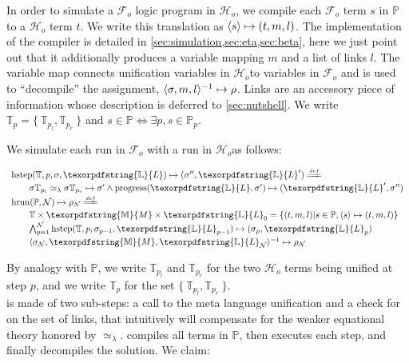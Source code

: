 \documentclass[sigconf,natbib=false,review]{acmart}
\newcommand{\UnifRel}{\ensuremath{\simeq}}
\newcommand{\Ue}{\ensuremath{\UnifRel_\lambda}\xspace}
\newcommand{\Fo}{\texorpdfstring{\ensuremath{\mathcal{F}_{\!o}\xspace}}{Fo}} %
\newcommand{\Ho}{\texorpdfstring{\ensuremath{\mathcal{H}_o}\xspace}{Ho}}
\newcommand{\linkStore}{\texorpdfstring{\ensuremath{\mathbb{L}}\xspace}{L}}
\newcommand{\mapStore}{\texorpdfstring{\ensuremath{\mathbb{M}}\xspace}{M}}
\newcommand{\foUnifPb}{\ensuremath{\mathbb{P}}\xspace}
\newcommand{\hoUnifPb}{\ensuremath{\mathbb{T}}\xspace}
\begin{document}
\noindent
In order to simulate a \Fo{} logic program in \Ho{}, we compile
each \Fo{} term $s$ in \foUnifPb to a \Ho{} term $t$.
We write this translation as $\langle s \rangle\mapsto(t,m,l)$. The implementation of the compiler
is detailed in \cref{sec:simulation,sec:eta,sec:beta}, here we just point
out that it additionally produces a variable mapping $m$ and a list of links $l$.
The variable map connects unification variables in \Ho to variables
in \Fo{} and is used to ``decompile'' the assignment,
$\langle \sigma,m,l \rangle^{-1}\mapsto \rho$. Links are an accessory piece of information whose
description is deferred to \cref{sec:nutshell}.
We write $\hoUnifPb_p = \{~ \hoUnifPb_{p_l}, \hoUnifPb_{p_r} ~\}$
and $s \in \foUnifPb \Leftrightarrow \exists p, s \in \foUnifPb_p$.

We simulate each run in \Fo{} with a run in \Ho as follows:

$$
\begin{array}{l}
\stepH{\hoUnifPb}{p}{\sigma}{\linkStore}{\sigma''}{\linkStore'} \deff\vspace{2pt}\\
  \qquad\stepHD{\hoUnifPb}{p}{\sigma}{\sigma'}{\sigma''}{\linkStore}\vspace{2pt}\\
  \runH{\foUnifPb}{\mathcal{N}}{\rho} \deff \vspace{2pt}\\
  \qquad \hoUnifPb \times \mapStore \times \linkStore_0 = \{ (t,m,l) | s \in \foUnifPb, \C{s}{t}{m}{l} \}\vspace{2pt}\\
  \qquad \runHD{\hoUnifPb}{\mathcal{N}}{\linkStore}\vspace{2pt}\\
  \qquad \D{\sigma_{\mathcal{N}}}{\mapStore}{\linkStore_{\mathcal{N}}}{\rho_{\mathcal{N}}}
\end{array}
$$

\noindent
By analogy with \foUnifPb, we write $\hoUnifPb_{p_l}$ and $\hoUnifPb_{p_r}$
for the two \Ho{} terms being unified at step $p$, and we write $\hoUnifPb_p$
for the set $\{~ \hoUnifPb_{p_l}, \hoUnifPb_{p_r} ~\}$.\\
\hstep{} is made of two sub-steps: a call to the meta language
unification and a check for \progress{} on the set of links, that intuitively
will compensate for the weaker equational theory honored by \Ue.
\hrun{} compiles all terms in \foUnifPb{}, then executes each step, and
finally decompiles the solution.
We claim:
\end{document}
